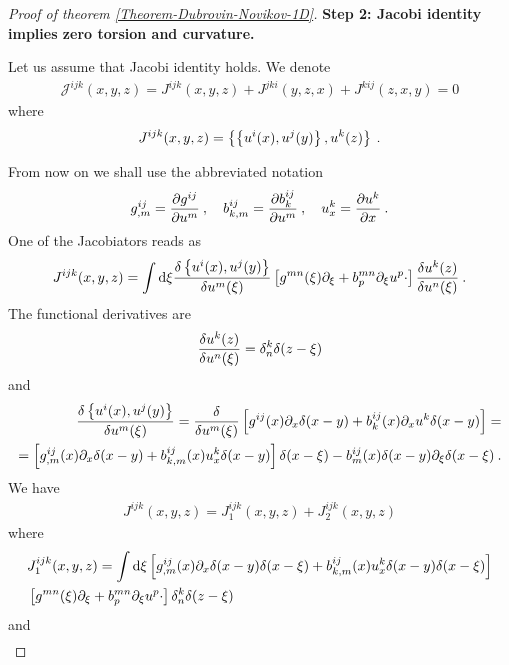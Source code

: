 \begin{proof}[Proof of theorem \ref{Theorem-Dubrovin-Novikov-1D}]
    \textbf{Step 2: Jacobi identity implies zero torsion and curvature.} 
    
    Let us assume that Jacobi identity holds. We denote
    \begin{align}
        \mathcal J^{ijk}(x,y,z) = J^{ijk}(x,y,z)+ J^{jki}(y,z,x)+ J^{kij}(z,x,y) = 0
    \end{align}
    where
    \begin{align}
        J^{ijk}(x,y,z) = \left \lbrace \left \lbrace u^i(x),u^j(y) \right \rbrace, u^k(z) \right \rbrace \:.
    \end{align}

    From now on we shall use the abbreviated notation
    \begin{align}
        g^{ij}_{,m} = \frac{\partial g^{ij}}{\partial u^m} \:, \quad b^{ij}_{k,m} = \frac{\partial b^{ij}_k}{\partial u^m} \:, \quad u^k_x = \frac{\partial u^k}{\partial x}  \:.
    \end{align}
    One of the Jacobiators reads as
    \begin{align*}
        J^{ijk}(x,y,z) =
        \int \mathrm{d} \xi \frac{\delta \left \lbrace u^i(x),u^j(y) \right \rbrace}{\delta u^m(\xi)} 
        \left[ g^{mn}(\xi) \partial_\xi + b^{mn}_p \partial_\xi u^p \cdot \right] \frac{\delta u^k(z)}{\delta u^n(\xi)}  \:.
    \end{align*}
    The functional derivatives are
    \begin{align}
        \frac{\delta u^k(z)}{\delta u^n(\xi)} = \delta^k_n \delta(z-\xi)
    \end{align}
    and 
    \begin{align}
        \frac{\delta \left \lbrace u^i(x),u^j(y) \right \rbrace}{\delta u^m(\xi)} = \frac{\delta }{\delta u^m(\xi)} \left[ g^{ij}(x) \partial_x \delta(x-y) + b^{ij}_k(x) \partial_x u^k \delta(x-y)\right] = 
        \nonumber
        \\ = \left[ g^{ij}_{,m}(x) \partial_x \delta(x-y) + b^{ij}_{k,m}(x) u^k_x \delta(x-y) \right] \delta (x-\xi) - b^{ij}_m(x) \delta(x-y) \partial_\xi \delta(x-\xi) \:.
    \end{align}
    We have
    \begin{align}
        J^{ijk}(x,y,z) = J_1^{ijk}(x,y,z) + J_2^{ijk}(x,y,z) 
    \end{align}
    where
    \begin{align*}
        & J_1^{ijk}(x,y,z) = \int \mathrm{d} \xi  \left[ g^{ij}_{,m}(x) \partial_x \delta(x-y) \delta(x-\xi) + b^{ij}_{k,m}(x) u^k_x \delta(x-y) \delta(x-\xi) \right]   \\ 
        & \left[ g^{mn}(\xi) \partial_\xi + b^{mn}_p \partial_\xi u^p \cdot \right] \delta^k_n \delta(z-\xi)  
    \end{align*}
    and 
    \begin{align*}

\end{align*}
\end{proof}
